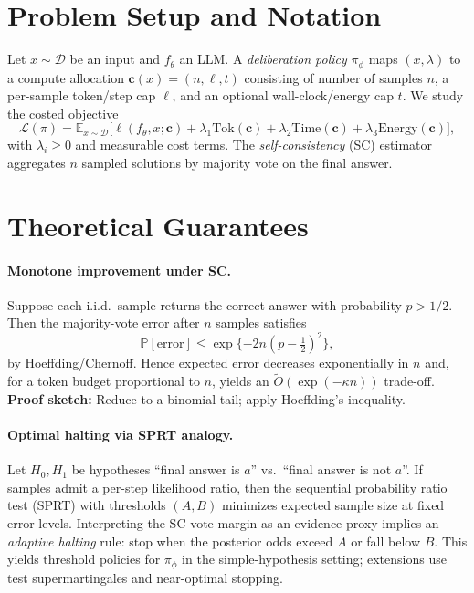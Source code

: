 \section{Problem Setup and Notation}
Let $x\sim\mathcal{D}$ be an input and $f_\theta$ an LLM. A \emph{deliberation policy} $\pi_\phi$ maps $(x,\lambda)$ to a compute allocation $\mathbf{c}(x)=(n,\ell,t)$ consisting of number of samples $n$, a per-sample token/step cap $\ell$, and an optional wall-clock/energy cap $t$.
We study the costed objective
\[
\mathcal{L}(\pi)=\mathbb{E}_{x\sim\mathcal{D}}\Big[\ell(f_\theta,x;\mathbf{c})+\lambda_1 \mathrm{Tok}(\mathbf{c})+\lambda_2 \mathrm{Time}(\mathbf{c})+\lambda_3 \mathrm{Energy}(\mathbf{c})\Big],
\]
with $\lambda_i\!\ge 0$ and measurable cost terms. The \emph{self-consistency} (SC) estimator aggregates $n$ sampled solutions by majority vote on the final answer.

\section{Theoretical Guarantees}
\paragraph{Monotone improvement under SC.}
Suppose each i.i.d.\ sample returns the correct answer with probability $p>1/2$. Then the majority-vote error after $n$ samples satisfies
\[
\mathbb{P}[\text{error}]\le \exp\{-2n(p-\tfrac{1}{2})^2\},
\]
by Hoeffding/Chernoff. Hence expected error decreases exponentially in $n$ and, for a token budget proportional to $n$, yields an $\tilde{O}(\exp(-\kappa n))$ trade-off. \textbf{Proof sketch:} Reduce to a binomial tail; apply Hoeffding's inequality.

\paragraph{Optimal halting via SPRT analogy.}
Let $H_0,H_1$ be hypotheses ``final answer is $a$'' vs.\ ``final answer is not $a$''. If samples admit a per-step likelihood ratio, then the sequential probability ratio test (SPRT) with thresholds $(A,B)$ minimizes expected sample size at fixed error levels. Interpreting the SC vote margin as an evidence proxy implies an \emph{adaptive halting} rule: stop when the posterior odds exceed $A$ or fall below $B$. This yields threshold policies for $\pi_\phi$ in the simple-hypothesis setting; extensions use test supermartingales and near-optimal stopping. 

